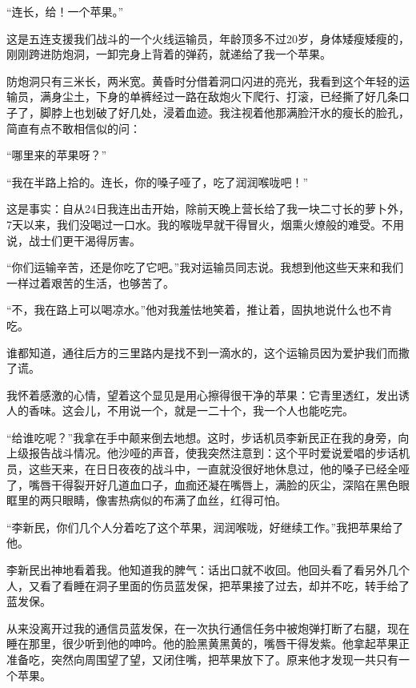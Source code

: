 \documentclass[12pt,UTF-8,openany]{ctexbook}
\begin{document}
\begin{Large}
    
    “连长，给！一个苹果。”
    
    这是五连支援我们战斗的一个火线运输员，年龄顶多不过20岁，身体矮瘦矮瘦的，刚刚跨进防炮洞，一卸完身上背着的弹药，就递给了我一个苹果。
    
    防炮洞只有三米长，两米宽。黄昏时分借着洞口闪进的亮光，我看到这个年轻的运输员，满身尘土，下身的单裤经过一路在敌炮火下爬行、打滚，已经撕了好几条口子了，脚脖上也划破了好几处，浸着血迹。我注视着他那满脸汗水的瘦长的脸孔，简直有点不敢相信似的问：
    
    “哪里来的苹果呀？”
    
    “我在半路上拾的。连长，你的嗓子哑了，吃了润润喉咙吧！”
    
    这是事实：自从24日我连出击开始，除前天晚上营长给了我一块二寸长的萝卜外，7天以来，我们没喝过一口水。我的喉咙早就干得冒火，烟熏火燎般的难受。不用说，战士们更干渴得厉害。
    
    “你们运输辛苦，还是你吃了它吧。”我对运输员同志说。我想到他这些天来和我们一样过着艰苦的生活，也够苦了。
    
    “不，我在路上可以喝凉水。”他对我羞怯地笑着，推让着，固执地说什么也不肯吃。
    
    谁都知道，通往后方的三里路内是找不到一滴水的，这个运输员因为爱护我们而撒了谎。
    
    我怀着感激的心情，望着这个显见是用心擦得很干净的苹果：它青里透红，发出诱人的香味。这会儿，不用说一个，就是一二十个，我一个人也能吃完。
    
    “给谁吃呢？”我拿在手中颠来倒去地想。这时，步话机员李新民正在我的身旁，向上级报告战斗情况。他沙哑的声音，使我突然注意到：这个平时爱说爱唱的步话机员，这些天来，在日日夜夜的战斗中，一直就没很好地休息过，他的嗓子已经全哑了，嘴唇干得裂开好几道血口子，血痂还凝在嘴唇上，满脸的灰尘，深陷在黑色眼眶里的两只眼睛，像害热病似的布满了血丝，红得可怕。
    
    “李新民，你们几个人分着吃了这个苹果，润润喉咙，好继续工作。”我把苹果给了他。
    
    李新民出神地看着我。他知道我的脾气：话出口就不收回。他回头看了看另外几个人，又看了看睡在洞子里面的伤员蓝发保，把苹果接了过去，却并不吃，转手给了蓝发保。
    
    从来没离开过我的通信员蓝发保，在一次执行通信任务中被炮弹打断了右腿，现在睡在那里，很少听到他的呻吟。他的脸黑黄黑黄的，嘴唇干得发紫。他拿起苹果正准备吃，突然向周围望了望，又闭住嘴，把苹果放下了。原来他才发现一共只有一个苹果。
    

\end{Large}
\end{document}

